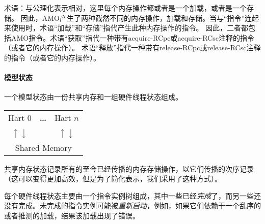 术语：与公理化表示相对，这里每个内存操作都或者是一个加载，或者是一个存储。
因此，AMO产生了两种截然不同的内存操作，加载和存储。当与“指令”连起来使用时，术语“加载”和“存储”指代产生此种内存操作的指令。
因此，二者都包括AMO指令。术语“获取”指代一种带有acquire-RCpc或acquire-RCsc注释的指令（或者它的内存操作）。
术语“释放”指代一种带有release-RCpc或release-RCsc注释的指令（或者它的内存操作）。

\paragraph{模型状态}
一个模型状态由一份共享内存和一组硬件线程状态组成。
\begin{center}
\sffamily
\begin{tabular}{ccc}
\cline{1-1}\cline{3-3}
\multicolumn{1}{|c|}{Hart 0} & \bf \dots & \multicolumn{1}{|c|}{Hart $n$} \\
\cline{1-1}\cline{3-3}
$\big\uparrow$ $\big\downarrow$ & & $\big\uparrow$ $\big\downarrow$ \\
\hline
\multicolumn{3}{|c|}{Shared Memory} \\
\hline
\end{tabular}
\end{center}
共享内存状态记录所有的至今已经传播的内存存储操作，以它们传播的次序记录（这可以变得更加高效，但是为了简化表示，我们采用了这种方式）。

每个硬件线程状态主要由一个指令实例树组成，其中一些已经\emph{完成}了，而另一些还没有完成。未完成的指令实例可能被\emph{重新启动}，例如，如果它们依赖于一个乱序的或者推测的加载，结果该加载出现了错误。

